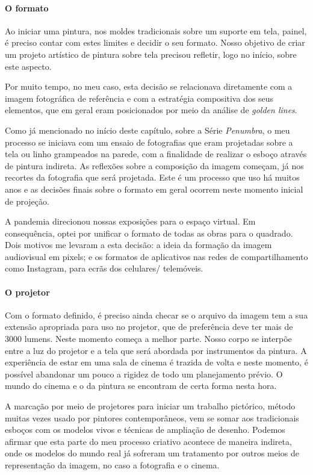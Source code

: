 \paragraph{O formato} Ao iniciar uma pintura, nos moldes tradicionais sobre um suporte em
tela, painel, é preciso contar com estes limites e decidir o seu
formato. Nosso objetivo de criar um projeto artístico de
pintura sobre tela precisou refletir, logo no início, sobre este
aspecto.

Por muito tempo, no meu caso, esta decisão se relacionava diretamente
com a imagem fotográfica de referência e com a estratégia compositiva
dos seus elementos, que em geral eram posicionados por meio da análise
de \emph{golden lines}.

Como já mencionado no início deste capítulo, sobre a Série
\emph{Penumbra}, o meu processo se iniciava com um ensaio de
fotografias que eram projetadas sobre a tela ou linho grampeados na
parede, com a finalidade de realizar o esboço através de pintura
indireta. As reflexões sobre a composição da imagem começam, já nos
recortes da fotografia que será projetada. Este é um processo que uso
há muitos anos e as decisões finais sobre o formato em geral ocorrem
neste momento inicial de projeção.

A pandemia direcionou nossas exposições para o espaço virtual. Em
consequência, optei por unificar o formato de todas as obras para o
quadrado. Dois motivos me levaram a esta decisão: a ideia da formação
da imagem audiovisual em pixels; e os formatos de aplicativos nas redes
de compartilhamento como Instagram, para ecrãs dos celulares\slash
telemóveis.

\paragraph{O projetor} Com o formato definido, é preciso ainda checar se o arquivo da imagem
tem a sua extensão apropriada para uso no projetor, que de preferência
deve ter mais de 3000 lumens. Neste momento começa a melhor parte.
Nosso corpo se interpõe entre a luz do projetor e a tela que será
abordada por instrumentos da pintura. A experiência de estar em uma
sala de cinema é trazida de volta e neste momento, é possível abandonar
um pouco a rigidez de todo um planejamento prévio. O mundo do cinema e
o da pintura se encontram de certa forma nesta hora.

A marcação por meio de projetores para iniciar um trabalho pictórico,
método muitas vezes usado por pintores contemporâneos, vem se somar aos
tradicionais esboços com os modelos vivos e técnicas de ampliação de
desenho. Podemos afirmar que esta parte do meu processo criativo
acontece de maneira indireta, onde os modelos do mundo real já sofreram
um tratamento por outros meios de representação da imagem, no caso a
fotografia e o cinema.

